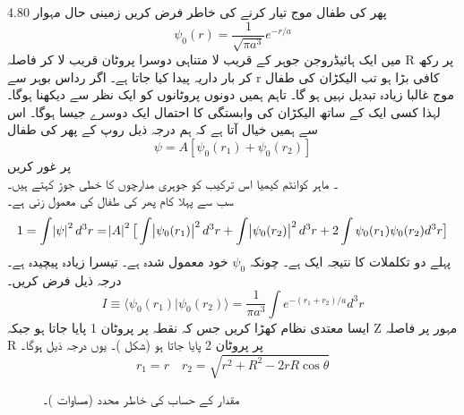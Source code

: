  پھر کی طفال موج تیار کرنے کی خاطر فرض کریں زمینی حال مہوار 4.80
\[\psi_{0}(r)=\frac{1}{\sqrt{\pi a^{3}}}e^{-r/a}\]
 میں ایک ہائیڈروجن جوہر کے قریب لا متناہی دوسرا پروٹان قریب لا کر فاصلہ  R پر رکھ کر بار داریہ پیدا کیا جاتا ہے۔ اگر رداس بوہر سے r کافی بڑا ہو تب الیکڑان کی طفال موج غالبا زیادہ تبدیل نہیں ہو گا۔ تاہم ہمیں دونوں پروٹانوں کو ایک نظر سے دیکھنا ہوگا۔ لہذا کسی ایک کے ساتھ الیکڑان کی وابستگی کا احتمال ایک دوسرے جیسا ہوگا۔ اس سے ہمیں خیال آتا ہے کہ ہم درجہ ذیل روپ کے پھر کی طفال 
  \[\psi=A[\psi_{0}(r_{1})+\psi_{0}(r_{2})]\]
 پر غور کریں\\
۔ ماہر کوانٹم کیمیا اس ترکیب کو جوہری مدارچوں کا خطی جوڑ کہتے ہیں۔ \\
سب سے پہلا کام پھر کی طفال کی معمول زنی ہے۔
 \[1=\int\abs{\psi}^{2}d^{3}r=\abs{A}^{2}\big [\int \abs{\psi_{0}(r_{1})}^{2}d^{3}r+\int \abs{\psi_{0}(r_{2})}^{2}d^{3}r+2\int\psi_{0}(r_{1})\psi_{0}(r_{2})d^{3}r\big ]\]
پہلے دو تکلملات کا نتیجہ ایک ہے۔ چونکہ  
\(\psi_{0}\)
خود معمول شدہ ہے۔ تیسرا زیادہ پیچیدہ ہے۔ درجہ ذیل فرض کریں۔\\
 \[I\equiv\langle \psi_{0}(r_{1})|\psi_{0}(r_{2})\rangle=\frac{1}{\pi a^{3}}\int e^{-(r_{1}+r_{2})/a}d^{3}r\]
ایسا معتدی نظام کھڑا کریں جس کہ نقطہ پر پروٹان 1 پایا جاتا ہو جبکہ Z مہور پر فاصلہ R پر پروٹان 2 پایا جاتا ہو (شکل  )۔  یوں درجہ ذیل ہوگا۔ \\
\[r_{1}=r \quad r_{2}=\sqrt{r^{2}+R^{2}-2rR\cos{\theta}}\]
%
\begin{figure}
\centering
{}
\caption{مقدار  کے حساب کی خاطر محدد (مساوات )۔}
\label{شکل_تغیریت_محدد_قدار_آئے}
\end{figure}

